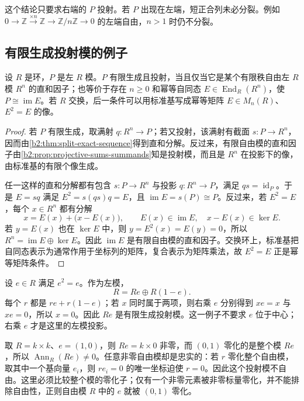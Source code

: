 这个结论只要求右端的 \(P\) 投射。若 \(P\) 出现在左端，短正合列未必分裂。例如 \(0\to\mathbb Z\xrightarrow{\times n}\mathbb Z\to\mathbb Z/n\mathbb Z\to0\) 的左端自由，\(n>1\) 时仍不分裂。

\subsection{有限生成投射模的例子}
\label{b2:subsec:0701:03}

\begin{proposition}\label{b2:prop:finite-projective-summand}
	设 \(R\) 是环，\(P\) 是左 \(R\) 模。\(P\) 有限生成且投射，当且仅当它是某个有限秩自由左 \(R\) 模 \(R^n\) 的直和因子；也等价于存在 \(n\ge0\) 和幂等自同态 \(E\in\operatorname{End}_R(R^n)\)，使 \(P\cong\operatorname{im}E\)。若 \(R\) 交换，后一条件可以用标准基写成幂等矩阵 \(E\in M_n(R)\)、\(E^2=E\) 的像。
\end{proposition}
\begin{proof}
	若 \(P\) 有限生成，取满射 \(q:R^n\to P\)；若又投射，该满射有截面 \(s:P\to R^n\)，因而由\cref{b2:thm:split-exact-sequence}得到直和分解。反过来，有限自由模的直和因子由\cref{b2:prop:projective-sums-summands}知是投射模，而且是 \(R^n\) 在投影下的像，由标准基的有限个像生成。

	任一这样的直和分解都有包含 \(s:P\to R^n\) 与投影 \(q:R^n\to P\)，满足 \(qs=\operatorname{id}_P\)。于是 \(E=sq\) 满足 \(E^2=s(qs)q=E\)，且 \(\operatorname{im}E=s(P)\cong P\)。反过来，若 \(E^2=E\)，每个 \(x\in R^n\) 都有分解
	\[
		x=E(x)+\bigl(x-E(x)\bigr),\qquad E(x)\in\operatorname{im}E,\quad x-E(x)\in\ker E.
	\]
	若 \(y=E(x)\) 也在 \(\ker E\) 中，则 \(y=E^2(x)=E(y)=0\)，所以 \(R^n=\operatorname{im}E\oplus\ker E\)。因此 \(\operatorname{im}E\) 是有限自由模的直和因子。交换环上，标准基把自同态表示为通常作用于坐标列的矩阵，复合表示为矩阵乘法，故 \(E^2=E\) 正是幂等矩阵条件。
\end{proof}

设 \(e\in R\) 满足 \(e^2=e\)。作为左模，
\[
	R=Re\oplus R(1-e).
\]
每个 \(r\) 都是 \(re+r(1-e)\)；若 \(x\) 同时属于两项，则右乘 \(e\) 分别得到 \(xe=x\) 与 \(xe=0\)，所以 \(x=0\)。因此 \(Re\) 是有限生成投射模。这一例子不要求 \(e\) 位于中心；右乘 \(e\) 才是这里的左模投影。

\ProseParagraphBreak
取 \(R=k\times k\)、\(e=(1,0)\)，则 \(Re=k\times0\) 非零，而 \((0,1)\) 零化的是整个模 \(Re\)，所以 \(\operatorname{Ann}_R(Re)\ne0\)。任意非零自由模却是忠实的：若 \(r\) 零化整个自由模，取其中一个基向量 \(e_i\)，则 \(re_i=0\) 的唯一坐标迫使 \(r=0\)。因此这个投射模不自由。这里必须比较整个模的零化子；仅有一个非零元素被非零标量零化，并不能排除自由性，正则自由模 \(R\) 中的 \(e\) 就被 \((0,1)\) 零化。

